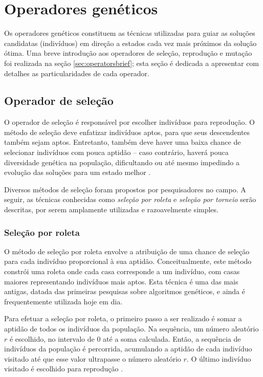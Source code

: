 \documentclass[12pt]{article}
\begin{document}
\section{Operadores genéticos} \label{sec:geneticoperators}

Os operadores genéticos constituem as técnicas utilizadas para guiar as soluções candidatas (indivíduos) em direção a estados cada vez mais próximos da solução ótima. Uma breve introdução aos operadores de seleção, reprodução e mutação foi realizada na seção \ref{sec:operatorsbrief}; esta seção é dedicada a apresentar com detalhes as particularidades de cada operador.

\subsection{Operador de seleção}

O operador de seleção é responsável por escolher indivíduos para reprodução. O método de seleção deve enfatizar indivíduos aptos, para que seus descendentes também sejam aptos. Entretanto, também deve haver uma baixa chance de selecionar indivíduos com pouca aptidão -- caso contrário, haverá pouca diversidade genética na população, dificultando ou até mesmo impedindo a evolução das soluções para um estado melhor \cite{Mitchell1998}.

Diversos métodos de seleção foram propostos por pesquisadores no campo. A seguir, as técnicas conhecidas como \textit{seleção por roleta} e \textit{seleção por torneio} serão descritas, por serem amplamente utilizadas e razoavelmente simples.

\subsubsection{Seleção por roleta} \label{sec:roulette}

O método de seleção por roleta envolve a atribuição de uma chance de seleção para cada indivíduo proporcional à sua aptidão. Conceitualmente, este método constrói uma roleta onde cada casa corresponde a um indivíduo, com casas maiores representando indivíduos mais aptos. Esta técnica é uma das mais antigas, datada das primeiras pesquisas sobre algoritmos genéticos, e ainda é frequentemente utilizada hoje em dia.

Para efetuar a seleção por roleta, o primeiro passo a ser realizado é somar a aptidão de todos os indivíduos da população. Na sequência, um número aleatório $r$ é escolhido, no intervalo de 0 até a soma calculada. Então, a sequência de indivíduos da população é percorrida, acumulando a aptidão de cada indivíduo visitado até que esse valor ultrapasse o número aleatório $r$. O último indivíduo visitado é escolhido para reprodução \cite{Mitchell1998}.
\end{document}
